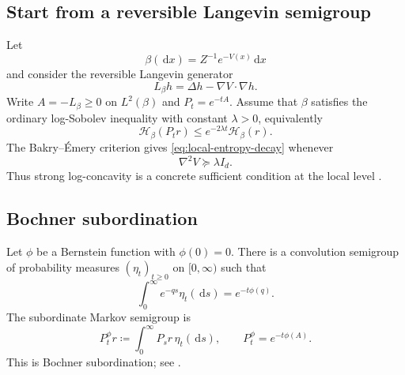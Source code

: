 \documentclass[11pt]{article}
\theoremstyle{definition}
\newcommand{\dd}{\,\mathrm d}
\newcommand{\cH}{\mathcal H}
\begin{document}
\subsection{Start from a reversible Langevin semigroup}

Let
\[
  \beta(\dd x)=Z^{-1}e^{-V(x)}\dd x
\]
and consider the reversible Langevin generator
\begin{equation}\label{eq:langevin-generator}
  L_\beta h=\Delta h-\nabla V\cdot\nabla h.
\end{equation}
Write $A=-L_\beta\geq0$ on $L^2(\beta)$ and $P_t=e^{-tA}$.
Assume that $\beta$ satisfies the ordinary log-Sobolev inequality with
constant $\lambda>0$, equivalently
\begin{equation}\label{eq:local-entropy-decay}
  \cH_\beta(P_t r)
  \leq e^{-2\lambda t}\cH_\beta(r).
\end{equation}
The Bakry--\'Emery criterion gives \eqref{eq:local-entropy-decay} whenever
\begin{equation}\label{eq:strong-log-concavity}
  \nabla^2V\succeq\lambda I_d.
\end{equation}
Thus strong log-concavity is a concrete sufficient condition at the local
level \citep{BakryGentilLedoux2014}.

\subsection{Bochner subordination}

Let $\phi$ be a Bernstein function with $\phi(0)=0$.  There is a convolution
semigroup of probability measures $(\eta_t)_{t\geq0}$ on $[0,\infty)$ such
that
\begin{equation}\label{eq:subordinator-laplace}
  \int_0^\infty e^{-qs}\eta_t(\dd s)=e^{-t\phi(q)}.
\end{equation}
The subordinate Markov semigroup is
\begin{equation}\label{eq:subordinate-semigroup}
  P_t^\phi r
  \coloneqq\int_0^\infty P_s r\,\eta_t(\dd s),
  \qquad
  P_t^\phi=e^{-t\phi(A)}.
\end{equation}
This is Bochner subordination; see
\citet{SchillingSongVondracek2012,SchillingWang2012}.
\end{document}
